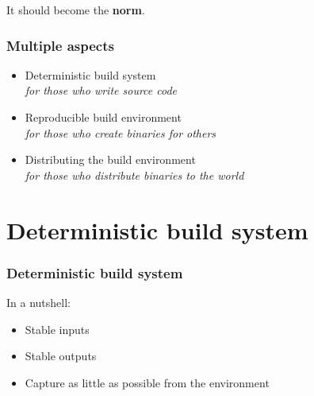 \documentclass[14pt,aspectratio=169]{beamer}
\begin{document}
\begin{frame}[plain]
\begin{center}
\Huge It should become the \textbf{norm}.
\end{center}
\end{frame}

\begin{frame}
\frametitle{Multiple aspects}

\begin{itemize}
\item Deterministic build system \\
  \textit{\small for those who write source code}
\item Reproducible build environment \\
  \textit{\small for those who create binaries for others}
\item Distributing the build environment \\
  \textit{\small for those who distribute binaries to the world}
\end{itemize}

\end{frame}

\section{Deterministic build system}

\begin{frame}
\frametitle{Deterministic build system}

In a nutshell:

\begin{itemize}
\item Stable inputs
\item Stable outputs
\item Capture as little as possible from the environment
\end{itemize}
\end{frame}

\begin{frame}[plain]
\end{frame}
\end{document}
